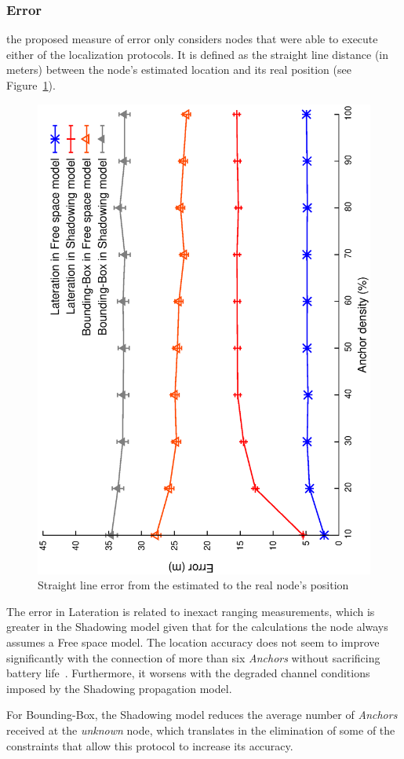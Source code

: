 \subsubsection{Error}
the proposed measure of error only considers nodes that were able to execute either of the localization protocols. It is defined as the straight line distance (in meters) between the node's estimated location and its real position (see Figure~\ref{fig:error}).

\begin{figure}[htbp]
  \centering
  \includegraphics[width=0.7\linewidth, angle = -90]{section4/figures/error.eps}
  \caption{Straight line error from the estimated to the real node's position
  \label{fig:error}}
\end{figure}

The error in Lateration is related to inexact ranging measurements, which is greater in the Shadowing model given that for the calculations the node always assumes a Free space model. The location accuracy does not seem to improve significantly with the connection of more than six \emph{Anchors} without sacrificing battery life~\cite{beaconLimits}. Furthermore, it worsens with the degraded channel conditions imposed by the Shadowing propagation model.

For Bounding-Box, the Shadowing model reduces the average number of \emph{Anchors} received at the \emph{unknown} node, which translates in the elimination of some of the constraints that allow this protocol to increase its accuracy.

